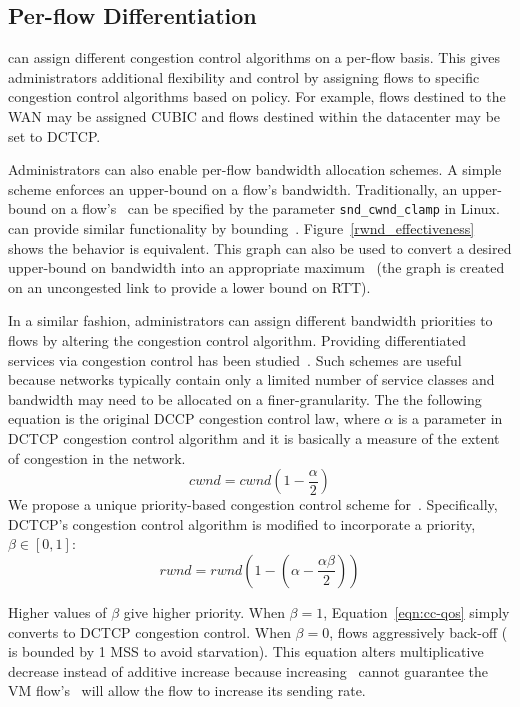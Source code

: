 \subsection{Per-flow Differentiation}
\label{ss:cc-qos}
\acdc{} can assign different congestion control algorithms
on a per-flow basis. This gives administrators additional flexibility and control by 
assigning flows to specific congestion control algorithms based on policy.
For example, flows destined to the WAN may be assigned CUBIC and flows destined within the
datacenter may be set to DCTCP. 

Administrators can also enable per-flow bandwidth allocation schemes.
A simple scheme enforces an upper-bound
on a flow's bandwidth. Traditionally, an upper-bound on a flow's~\cwnd{} can be
specified by the parameter {\tt snd\_cwnd\_clamp} in Linux.~\acdc{} can provide similar functionality
by bounding~\rwnd{}. Figure~\ref{rwnd_effectiveness} shows the behavior is equivalent. This 
graph can also be used to convert a desired upper-bound on bandwidth into an appropriate maximum~\rwnd{} (the
graph is created on an uncongested link to provide a lower bound on RTT). 

In a similar fashion, administrators can assign different bandwidth priorities to flows by altering the 
congestion control algorithm. Providing differentiated services via congestion control has 
been studied~\cite{Venkataramani2002tcpnice,shieh2011sharing}. Such schemes are useful because networks
typically contain only a limited number of service classes and bandwidth may need to be allocated on
a finer-granularity. The the following equation is the original DCCP congestion control law, where
$\alpha{}$ is a parameter in DCTCP congestion control algorithm and it is basically a measure of the extent of congestion in the network.
\begin{equation}
cwnd = cwnd (1 - \frac{\alpha{}}{2})
\label{eqn:dctcp}
\end{equation}
We propose a unique priority-based congestion control scheme for~\acdc{}.
Specifically, DCTCP's congestion control algorithm is modified to incorporate a priority, $\beta \in [0,1]$:
\begin{equation}
rwnd = rwnd (1 - (\alpha - \frac{\alpha{}\beta}{2}))
\label{eqn:cc-qos}
\end{equation}

Higher values of $\beta$ give higher priority. 
When $\beta{}=1$, Equation~\ref{eqn:cc-qos} simply converts to DCTCP congestion control. When
$\beta{}=0$, flows aggressively back-off (\rwnd{} is bounded by 1 MSS to avoid starvation). This equation
alters multiplicative decrease instead of additive increase because increasing~\rwnd{} 
cannot guarantee the VM flow's~\cwnd{} will allow the flow to increase its sending rate.

